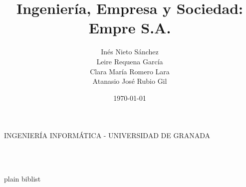 \documentclass [12pt, spanish] {article}
\title {
	Ingeniería, Empresa y Sociedad: \\
	Empre S.A.
	\hspace {0.05cm}
}
\author {
	Inés Nieto Sánchez \\
	Leire Requena García \\
	Clara María Romero Lara \\
	Atanasio José Rubio Gil
}
\date {\today}
\makeatletter
\let\thetitle\@title
\let\theauthor\@author
\let\thedate\@date
\makeatother
\begin{document}

\begin {titlepage}
	\begin {center}
		\vspace* {8 cm}
		\textsc {INGENIERÍA INFORMÁTICA - UNIVERSIDAD DE GRANADA} \\
		{\huge \bfseries \thetitle} \\ [8 cm]
	\end {center}

	\begin {flushright}
		\large \theauthor \\ [1 cm]
	\end {flushright}

	\begin {center}
		\large \thedate
	\end {center}
\end {titlepage}


\tableofcontents
\pagebreak


%
%
%

\pagebreak


 {plain}
 {biblist}
\end{document}
